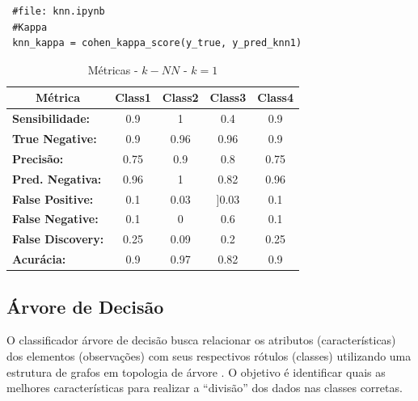 \documentclass[
	article,			%
	11pt,				%
	oneside,			%
	a4paper,			%
	english,			%
	brazil,				%
	sumario=tradicional
	]{abntex2}
\begin{document}
\begin{verbatim}
 #file: knn.ipynb
 #Kappa
 knn_kappa = cohen_kappa_score(y_true, y_pred_knn1)
\end{verbatim}

\begin{table}[H]
\centering
\begin{tabular}{|l|c|c|c|c|}
\hline
\multicolumn{1}{|c|}{\textbf{Métrica}} & \textbf{Class1} & \textbf{Class2} & \textbf{Class3} & \textbf{Class4} \\ \hline
\textbf{Sensibilidade:}                & 0.9             & 1               & 0.4             & 0.9             \\ \hline
\textbf{True Negative:}                & 0.9             & 0.96            & 0.96            & 0.9             \\ \hline
\textbf{Precisão:}                     & 0.75            & 0.9             & 0.8             & 0.75            \\ \hline
\textbf{Pred. Negativa:}               & 0.96            & 1               & 0.82            & 0.96            \\ \hline
\textbf{False Positive:}               & 0.1             & 0.03            & {]}0.03         & 0.1             \\ \hline
\textbf{False Negative:}               & 0.1             & 0               & 0.6             & 0.1             \\ \hline
\textbf{False Discovery:}              & 0.25            & 0.09            & 0.2             & 0.25            \\ \hline
\textbf{Acurácia:}                     & 0.9             & 0.97            & 0.82            & 0.9             \\ \hline
\end{tabular}
\caption{Métricas - $k-NN$ - $k=1$}
\label{tab:metrics_knn}
\end{table}

\subsection{Árvore de Decisão}

O classificador árvore de decisão busca relacionar os atributos (características) dos elementos (observações) com seus respectivos rótulos (classes) utilizando uma estrutura de grafos em topologia de árvore \cite{Safavian1991}. O objetivo é identificar quais as melhores características para realizar a ``divisão'' dos dados nas classes corretas.
\end{document}
